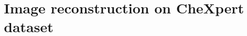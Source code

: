 \documentclass{article}
\begin{document}





\appendix

\newpage
\section{Image reconstruction on CheXpert dataset}
\label{sec:appendix}
\end{document}
